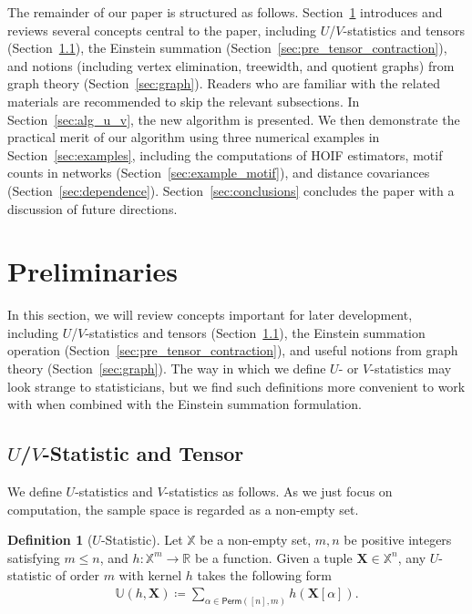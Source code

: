 \documentclass[12pt]{article}
\newcommand{\pdfu}{\texorpdfstring{$U$}{U}}
\newcommand{\pdfv}{\texorpdfstring{$V$}{V}}
\theoremstyle{plain}
\theoremstyle{definition}
\newtheorem{definition}{Definition}
\newcommand{\ustat}{\mathbb{U}}
\newcommand{\ustatp}[2]{\ustat(#1,#2)}
\newcommand{\perm}[1]{\mathsf{Perm}(#1)}
\newcommand{\degp}[2]{\deg(#1,#2)}
\newcommand{\bbR}{{\mathbb{R}}}
\def\bbX{\mathbb{X}}
\begin{document}
\begin{bibunit}[agsm]

The remainder of our paper is structured as follows. Section~\ref{sec:preliminaries} introduces and reviews several concepts central to the paper, including $U$/$V$-statistics and tensors (Section~\ref{sec:pre_u_v}), the Einstein summation (Section~\ref{sec:pre_tensor_contraction}), and notions (including vertex elimination, treewidth, and quotient graphs) from graph theory (Section~\ref{sec:graph}). Readers who are familiar with the related materials are recommended to skip the relevant subsections. In Section~\ref{sec:alg_u_v}, the new algorithm is presented. We then demonstrate the practical merit of our algorithm using three numerical examples in Section~\ref{sec:examples}, including the computations of HOIF estimators, motif counts in networks (Section~\ref{sec:example_motif}), and distance covariances (Section~\ref{sec:dependence}). Section~\ref{sec:conclusions} concludes the paper with a discussion of future directions.

\section{Preliminaries}
\label{sec:preliminaries}

In this section, we will review concepts important for later development, including $U$/$V$-statistics and tensors (Section~\ref{sec:pre_u_v}), the Einstein summation operation (Section~\ref{sec:pre_tensor_contraction}), and useful notions from graph theory (Section~\ref{sec:graph}). The way in which we define $U$- or $V$-statistics may look strange to statisticians, but we find such definitions more convenient to work with when combined with the Einstein summation formulation.

\subsection{\pdfu/\pdfv-Statistic and Tensor}\label{sec:pre_u_v}

We define $U$-statistics and $V$-statistics as follows. As we just focus on computation, the sample space is regarded as a non-empty set. 

\begin{definition}[$U$-Statistic]\label{def:u_stat}
Let $\bbX$ be a non-empty set, $m, n$ be positive integers satisfying $m \leq n$, and $h: \bbX^{m} \rightarrow \bbR$ be a function. Given a tuple $\bm{X} \in \bbX^n$, any $U$-statistic of order $m$ with kernel $h$ takes the following form 
    \begin{align*}
        \ustatp{h}{\bm{X}} \coloneqq \sum_{\alpha \in \perm{[n],m}} h(\bm{X}[\alpha]). 
    \end{align*}
\end{definition}


\end{bibunit}
\end{document}
